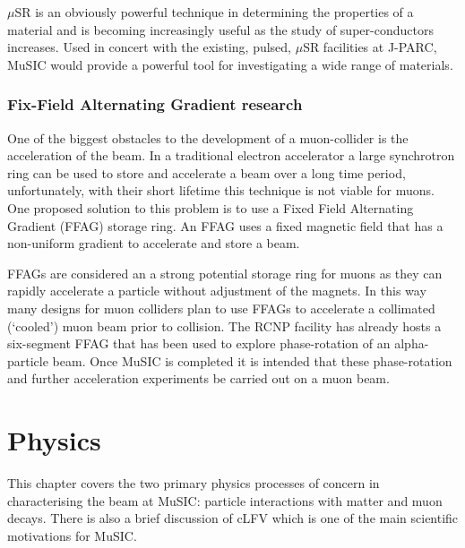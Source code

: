 \( \mu \)SR is an obviously powerful technique in determining the properties of a material and is becoming increasingly useful as the study of super-conductors increases. Used in concert with the existing, pulsed, \( \mu \)SR facilities at J-PARC, MuSIC would provide a powerful tool for investigating a wide range of materials.

\subsubsection{Fix-Field Alternating Gradient research} %
\label{sub:ffag_research}
One of the biggest obstacles to the development of a muon-collider is the acceleration of the beam. In a traditional electron accelerator a large synchrotron ring can be used to store and accelerate a beam over a long time period, unfortunately, with their short lifetime this technique is not viable for muons. One proposed solution to this problem is to use a Fixed Field Alternating Gradient (FFAG) storage ring. An FFAG uses a fixed magnetic field that has a non-uniform gradient to accelerate and store a beam.

FFAGs are considered an a strong potential storage ring for muons as they can rapidly accelerate a particle without adjustment of the magnets. In this way many designs for muon colliders plan to use FFAGs to accelerate a collimated (`cooled') muon beam prior to collision. The RCNP facility has already hosts a six-segment FFAG that has been used to explore phase-rotation of an alpha-particle beam. Once MuSIC is completed it is intended that these phase-rotation and further acceleration experiments be carried out on a muon beam.
\section{Physics} %
\label{cha:physics}
This chapter covers the two primary physics processes of concern in characterising the beam at MuSIC: particle interactions with matter and muon decays. There is also a brief discussion of cLFV which is one of the main scientific motivations for MuSIC. 
